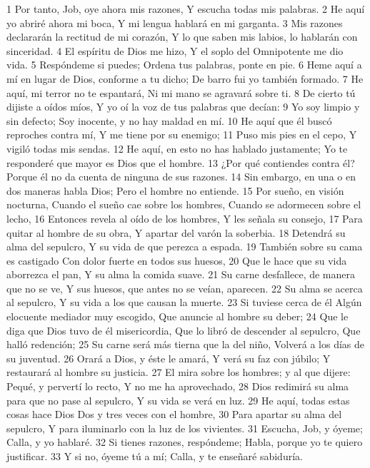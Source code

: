 1 Por tanto, Job, oye ahora mis razones,  
Y escucha todas mis palabras.  
2 He aquí yo abriré ahora mi boca,  
Y mi lengua hablará en mi garganta.  
3 Mis razones declararán la rectitud de mi corazón,  
Y lo que saben mis labios, lo hablarán con sinceridad.  
4 El espíritu de Dios me hizo,  
Y el soplo del Omnipotente me dio vida.  
5 Respóndeme si puedes;  
Ordena tus palabras, ponte en pie.  
6 Heme aquí a mí en lugar de Dios, conforme a tu dicho;  
De barro fui yo también formado.  
7 He aquí, mi terror no te espantará,  
Ni mi mano se agravará sobre ti.  
8 De cierto tú dijiste a oídos míos,  
Y yo oí la voz de tus palabras que decían: 
9 Yo soy limpio y sin defecto;  
Soy inocente, y no hay maldad en mí. 
10 He aquí que él buscó reproches contra mí,  
Y me tiene por su enemigo;  
11 Puso mis pies en el cepo,  
Y vigiló todas mis sendas.  
12 He aquí, en esto no has hablado justamente;  
Yo te responderé que mayor es Dios que el hombre.  
13 ¿Por qué contiendes contra él?  
Porque él no da cuenta de ninguna de sus razones.  
14 Sin embargo, en una o en dos maneras habla Dios;  
Pero el hombre no entiende.  
15 Por sueño, en visión nocturna,  
Cuando el sueño cae sobre los hombres, 
Cuando se adormecen sobre el lecho, 
16 Entonces revela al oído de los hombres,  
Y les señala su consejo,  
17 Para quitar al hombre de su obra,  
Y apartar del varón la soberbia.  
18 Detendrá su alma del sepulcro,  
Y su vida de que perezca a espada.  
19 También sobre su cama es castigado  
Con dolor fuerte en todos sus huesos,  
20 Que le hace que su vida aborrezca el pan,  
Y su alma la comida suave.  
21 Su carne desfallece, de manera que no se ve,  
Y sus huesos, que antes no se veían, aparecen.  
22 Su alma se acerca al sepulcro,  
Y su vida a los que causan la muerte.  
23 Si tuviese cerca de él  
Algún elocuente mediador muy escogido,  
Que anuncie al hombre su deber;  
24 Que le diga que Dios tuvo de él misericordia,  
Que lo libró de descender al sepulcro,  
Que halló redención;  
25 Su carne será más tierna que la del niño,  
Volverá a los días de su juventud.  
26 Orará a Dios, y éste le amará,  
Y verá su faz con júbilo;  
Y restaurará al hombre su justicia.  
27 El mira sobre los hombres; y al que dijere:  
Pequé, y pervertí lo recto,  
Y no me ha aprovechado,  
28 Dios redimirá su alma para que no pase al sepulcro,  
Y su vida se verá en luz.  
29 He aquí, todas estas cosas hace Dios  
Dos y tres veces con el hombre,  
30 Para apartar su alma del sepulcro,  
Y para iluminarlo con la luz de los vivientes.  
31 Escucha, Job, y óyeme;  
Calla, y yo hablaré.  
32 Si tienes razones, respóndeme;  
Habla, porque yo te quiero justificar.  
33 Y si no, óyeme tú a mí;  
Calla, y te enseñaré sabiduría. 

